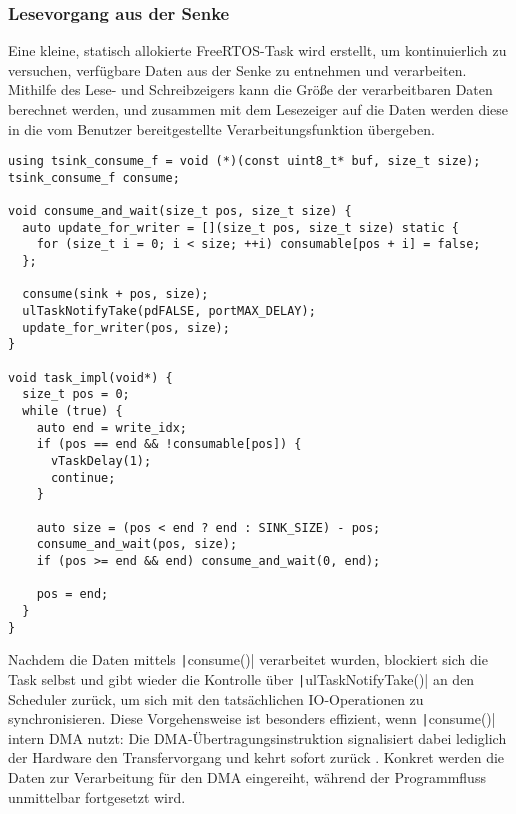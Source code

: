 \subsubsection{Lesevorgang aus der Senke}

Eine kleine, statisch allokierte FreeRTOS-Task wird erstellt, um kontinuierlich
zu versuchen, verfügbare Daten aus der Senke zu entnehmen und verarbeiten.
Mithilfe des Lese- und Schreibzeigers kann die Größe der verarbeitbaren Daten
berechnet werden, und zusammen mit dem Lesezeiger auf die Daten werden diese in
die vom Benutzer bereitgestellte Verarbeitungsfunktion übergeben.

\begin{code}
\begin{verbatim}
using tsink_consume_f = void (*)(const uint8_t* buf, size_t size);
tsink_consume_f consume;

void consume_and_wait(size_t pos, size_t size) {
  auto update_for_writer = [](size_t pos, size_t size) static {
    for (size_t i = 0; i < size; ++i) consumable[pos + i] = false;
  };

  consume(sink + pos, size);
  ulTaskNotifyTake(pdFALSE, portMAX_DELAY);
  update_for_writer(pos, size);
}

void task_impl(void*) {
  size_t pos = 0;
  while (true) {
    auto end = write_idx;
    if (pos == end && !consumable[pos]) {
      vTaskDelay(1);
      continue;
    }

    auto size = (pos < end ? end : SINK_SIZE) - pos;
    consume_and_wait(pos, size);
    if (pos >= end && end) consume_and_wait(0, end);

    pos = end;
  }
}
\end{verbatim}
    \label{code:consume}
\end{code}

Nachdem die Daten mittels \texttt|consume()| verarbeitet wurden,
blockiert sich die Task selbst und gibt wieder die Kontrolle über
\texttt|ulTaskNotifyTake()| an den Scheduler zurück, um sich mit den
tatsächlichen IO-Operationen zu synchronisieren. Diese Vorgehensweise ist
besonders effizient, wenn \texttt|consume()| intern DMA nutzt: Die
DMA-Übertragungsinstruktion signalisiert dabei lediglich der Hardware den
Transfervorgang und kehrt sofort zurück \cite{HAL_UART_Transmit_DMA}. Konkret
werden die Daten zur Verarbeitung für den DMA eingereiht, während der
Programmfluss unmittelbar fortgesetzt wird.

